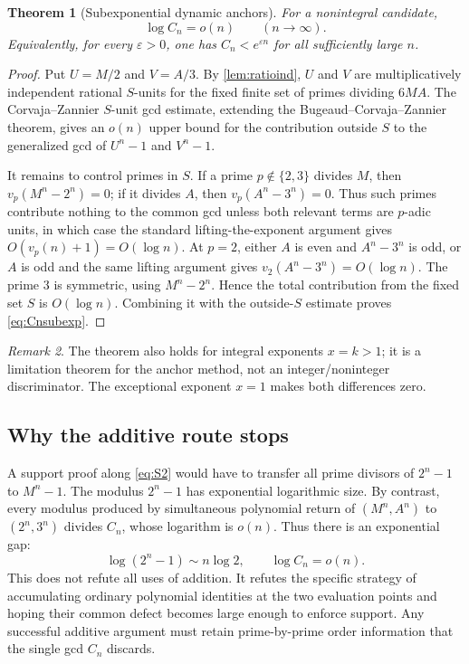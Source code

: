 \documentclass[11pt]{article}
\newtheorem{theorem}{Theorem}[section]
\theoremstyle{definition}
\theoremstyle{remark}
\newtheorem{remark}[theorem]{Remark}
\begin{document}
\begin{theorem}[Subexponential dynamic anchors]\label{thm:Cnsubexp}
For a nonintegral candidate,
\[
       \log C_n=o(n)
       \qquad(n\to\infty).
       \tag{8.3}\label{eq:Cnsubexp}
\]
Equivalently, for every $\varepsilon>0$, one has $C_n<e^{\varepsilon n}$ for all sufficiently
large $n$.
\end{theorem}
\begin{proof}
Put $U=M/2$ and $V=A/3$.  By \cref{lem:ratioind}, $U$ and $V$ are multiplicatively
independent rational $S$-units for the fixed finite set of primes dividing $6MA$.  The
Corvaja--Zannier $S$-unit gcd estimate, extending the Bugeaud--Corvaja--Zannier theorem, gives
an $o(n)$ upper bound for the contribution outside $S$ to the generalized gcd of
$U^n-1$ and $V^n-1$.

It remains to control primes in $S$.  If a prime $p\notin\{2,3\}$ divides $M$, then
$v_p(M^n-2^n)=0$; if it divides $A$, then $v_p(A^n-3^n)=0$.  Thus such primes contribute
nothing to the common gcd unless both relevant terms are $p$-adic units, in which case the
standard lifting-the-exponent argument gives $O(v_p(n)+1)=O(\log n)$.  At $p=2$, either
$A$ is even and $A^n-3^n$ is odd, or $A$ is odd and the same lifting argument gives
$v_2(A^n-3^n)=O(\log n)$.  The prime $3$ is symmetric, using $M^n-2^n$.  Hence the total
contribution from the fixed set $S$ is $O(\log n)$.  Combining it with the outside-$S$
estimate proves \eqref{eq:Cnsubexp}.
\end{proof}

\begin{remark}
The theorem also holds for integral exponents $x=k>1$; it is a limitation theorem for the
anchor method, not an integer/noninteger discriminator.  The exceptional exponent $x=1$ makes
both differences zero.
\end{remark}

\subsection{Why the additive route stops}

A support proof along \eqref{eq:S2} would have to transfer all prime divisors of $2^n-1$ to
$M^n-1$.  The modulus $2^n-1$ has exponential logarithmic size.  By contrast, every modulus
produced by simultaneous polynomial return of $(M^n,A^n)$ to $(2^n,3^n)$ divides $C_n$, whose
logarithm is $o(n)$.  Thus there is an exponential gap:
\[
      \log(2^n-1)\sim n\log2,
      \qquad
      \log C_n=o(n).
\]
This does not refute all uses of addition.  It refutes the specific strategy of accumulating
ordinary polynomial identities at the two evaluation points and hoping their common defect
becomes large enough to enforce support.  Any successful additive argument must retain
prime-by-prime order information that the single gcd $C_n$ discards.
\end{document}
